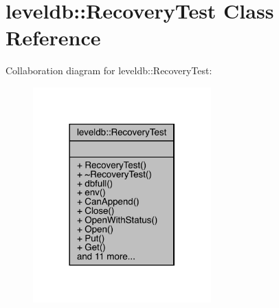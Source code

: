 \hypertarget{classleveldb_1_1_recovery_test}{}\section{leveldb\+::Recovery\+Test Class Reference}
\label{classleveldb_1_1_recovery_test}


Collaboration diagram for leveldb\+::Recovery\+Test\+:
\nopagebreak
\begin{figure}[H]
\begin{center}
\leavevmode
\includegraphics[width=194pt]{classleveldb_1_1_recovery_test__coll__graph}
\end{center}
\end{figure}
